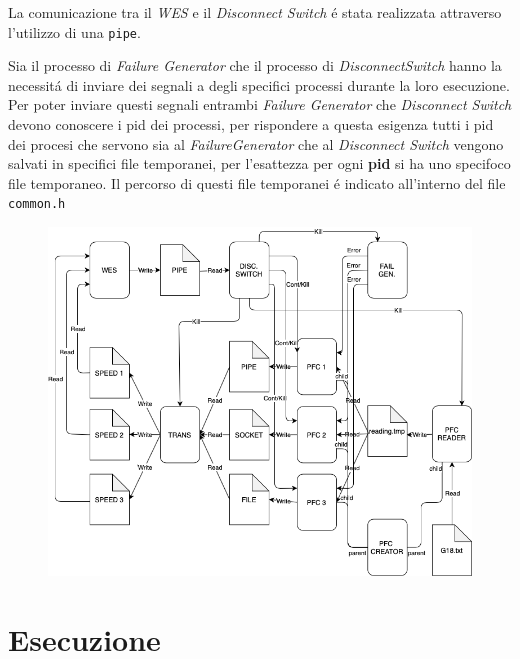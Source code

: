 \documentclass[11pt, oneside]{article}   	%
\begin{document}
La comunicazione tra il \textit{WES} e il \textit{Disconnect Switch} \'e stata realizzata attraverso l'utilizzo di una \texttt{pipe}.\par 

Sia il processo di \textit{Failure Generator} che il processo di \textit{DisconnectSwitch} hanno la necessit\'a di inviare dei segnali a degli specifici processi durante la loro esecuzione. Per poter inviare questi segnali entrambi \textit{Failure Generator} che \textit{Disconnect Switch} devono conoscere i pid dei processi, per rispondere a questa esigenza tutti i pid dei procesi che servono sia al \textit{FailureGenerator} che al \textit{Disconnect Switch} vengono salvati in specifici file temporanei, per l'esattezza per ogni \textbf{pid} si ha uno specifoco file temporaneo. Il percorso di questi file temporanei \'e indicato all'interno del file \texttt{common.h} \par

\newpage
\begin{figure}[h!]
	\centering
	\includegraphics[scale=0.5]{schema.png}
\end{figure}
    
\section{Esecuzione}
\end{document}

